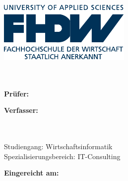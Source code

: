 \begin{titlepage}
\begin{center}

\includegraphics[scale=1.20]{img/fhdw.pdf}\\
\vspace{2cm}
\Huge{\bfseries\dokumententyp}
~\vspace{.5cm}\\
\LARGE{\dokumententitel}
~\vspace{2cm}\\

\large{

\textbf{Prüfer:}\vspace{1mm}\\
\dokumentenpruefer

\vspace{1.5cm}

\textbf{Verfasser:}\\\vspace{1mm}
\dokumentenautor\\
\dokumentenautoradress\\
\dokumentenautornummer

\vspace{1cm}
Studiengang: Wirtschaftsinformatik\\
Spezialisierungsbereich: IT-Consulting

\vspace{0.75cm}
\textbf{Eingereicht am:}\vspace{1mm}\\
\abgabedatum
}
\end{center}

\end{titlepage}

